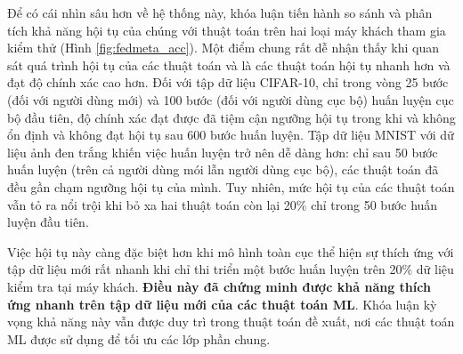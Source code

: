 \begin{table}
    \centering
    \caption{Bảng độ chính xác (\%) của thuật toán FedAvg và các thuật toán FedMeta tính trên điểm dữ liệu (dữ liệu Non-IID)}
    \label{tab:acc_fedmeta}
\end{table}

Để có cái nhìn sâu hơn về hệ thống này, khóa luận tiến hành so sánh và phân tích khả năng hội tụ của chúng với thuật toán  trên hai loại máy khách tham gia kiểm thử (Hình \ref{fig:fedmeta_acc}). Một điểm chung rất dễ nhận thấy khi quan sát quá trình hội tụ của các thuật toán  và  là các thuật toán  hội tụ nhanh hơn và đạt độ chính xác cao hơn. Đối với tập dữ liệu CIFAR-10, chỉ trong vòng 25 bước (đối với người dùng mới) và 100 bước (đối với người dùng cục bộ) huấn luyện cục bộ đầu tiên, độ chính xác đạt được đã tiệm cận ngưỡng hội tụ trong khi  và  không ổn định và không đạt hội tụ sau 600 bước huấn luyện. Tập dữ liệu MNIST với dữ liệu ảnh đen trắng khiến việc huấn luyện trở nên dễ dàng hơn: chỉ sau 50 bước huấn luyện (trên cả người dùng mói lẫn người dùng cục bộ), các thuật toán đã đều gần chạm ngưỡng hội tụ của mình. Tuy nhiên, mức hội tụ của các thuật toán  vẫn tỏ ra nổi trội khi bỏ xa hai thuật toán còn lại 20\% chỉ trong 50 bước huấn luyện đầu tiên.

Việc hội tụ này càng đặc biệt hơn khi mô hình toàn cục thể hiện sự thích ứng với tập dữ liệu mới rất nhanh khi chỉ thi triển một bước huấn luyện trên 20\% dữ liệu kiểm tra tại máy khách. \textbf{Điều này đã chứng minh được khả năng thích ứng nhanh trên tập dữ liệu mới của các thuật toán ML}. Khóa luận kỳ vọng khả năng này vẫn được duy trì trong thuật toán đề xuất, nơi các thuật toán ML được sử dụng để tối ưu các lớp phần chung.

